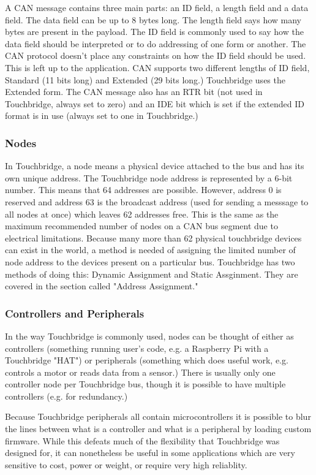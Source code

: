 \documentclass[12pt]{article}
\begin{document}
A CAN message contains three main parts: an ID field, a length field and a data
field. The data field can be up to 8 bytes long. The length field says how many
bytes are present in the payload. The ID field is commonly used to say how the
data field should be interpreted or to do addressing of one form or another.
The CAN protocol doesn't place any constraints on how the ID field should be
used. This is left up to the application. CAN supports two different lengths of
ID field, Standard (11 bits long) and Extended (29 bits long.) Touchbridge uses
the Extended form. The CAN message also has an RTR bit (not used in
Touchbridge, always set to zero) and an IDE bit which is set if the extended ID
format is in use (always set to one in Touchbridge.)

\subsubsection{Nodes}


In Touchbridge, a node means a physical device attached to the bus and has its
own unique address. The Touchbridge node address is represented by a 6-bit
number. This means that 64 addresses are possible. However, address 0 is
reserved and address 63 is the broadcast address (used for sending a messsage
to all nodes at once) which leaves 62 addresses free.  This is the same as the
maximum recommended number of nodes on a CAN bus segment due to electrical
limitations. Because many more than 62 physical touchbridge devices can exist
in the world, a method is needed of assigning the limited number of node
address to the devices present on a particular bus. Touchbridge has two methods
of doing this: Dynamic Assignment and Static Assginment. They are
covered in the section called "Address Assignment."

\subsubsection{Controllers and Peripherals}

In the way Touchbridge is commonly used, nodes can be thought of either as
controllers (something running user's code, e.g. a Raspberry Pi with a
Touchbridge "HAT") or peripherals (something which does useful work, e.g.
controls a motor or reads data from a sensor.) There is usually only one
controller node per Touchbridge bus, though it is possible to have multiple
controllers (e.g. for redundancy.)

Because Touchbridge peripherals all contain microcontrollers it is possible to
blur the lines between what is a controller and what is a peripheral by loading
custom firmware. While this defeats much of the flexibility that Touchbridge
was designed for, it can nonetheless be useful in some applications which are
very sensitive to cost, power or weight, or require very high reliablity.
\end{document}
